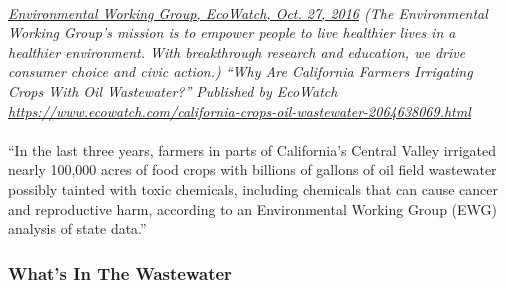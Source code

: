 \documentclass{article}
\begin{document}
\paragraph{}
\small
\textit{
\underline{Environmental Working Group, EcoWatch, Oct. 27, 2016}
(The Environmental Working Group’s mission is to empower people to live healthier lives in a healthier environment. With breakthrough research and education, we drive consumer choice and civic action.) “Why Are California Farmers Irrigating Crops With Oil Wastewater?” Published by EcoWatch \url{https://www.ecowatch.com/california-crops-oil-wastewater-2064638069.html}}
\normalsize
\paragraph{}
``In the last three years, farmers in parts of California's Central Valley irrigated nearly 100,000 acres of food crops with billions of gallons of oil field wastewater possibly tainted with toxic chemicals, including chemicals that can cause cancer and reproductive harm, according to an Environmental Working Group (EWG) analysis of state data.”

\subsubsection{What's In The Wastewater}
\end{document}
